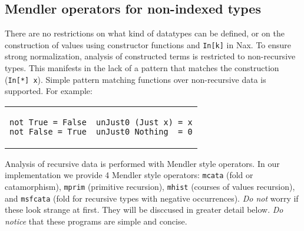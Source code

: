 \subsection{Mendler operators for non-indexed types}
There are no restrictions on what kind of datatypes
can be defined, or on the construction of values using constructor
functions and \verb+In[k]+ in Nax. To ensure strong normalization, analysis of constructed
terms is restricted to non-recursive types. This manifests in the lack of
a pattern that matches the construction (\verb+In[*] x+). Simple pattern matching functions
over non-recursive data is supported. For example:

\vspace*{.1in}
\begin{tabular}{l|l}
\begin{minipage}[l]{.42\linewidth}
{\small
\begin{verbatim}
not True = False
not False = True
\end{verbatim}}
\end{minipage}

& 

\begin{minipage}[l]{.50\linewidth}
{\small
\begin{verbatim}
unJust0 (Just x) = x
unJust0 Nothing  = 0
\end{verbatim}}
\end{minipage}
\end{tabular}
\vspace*{.1in}

Analysis of recursive data is performed with Mendler style operators. In our
implementation we provide 4 Mendler style operators: \verb+mcata+ (fold or catamorphism), 
\verb+mprim+ (primitive recursion), \verb+mhist+ (courses of values recursion),
and \verb+msfcata+ (fold for recursive types with negative occurrences). {\em Do not}
worry if these look strange at first. They will be disccused in greater detail
below. {\em Do notice} that these programs are simple and concise.

